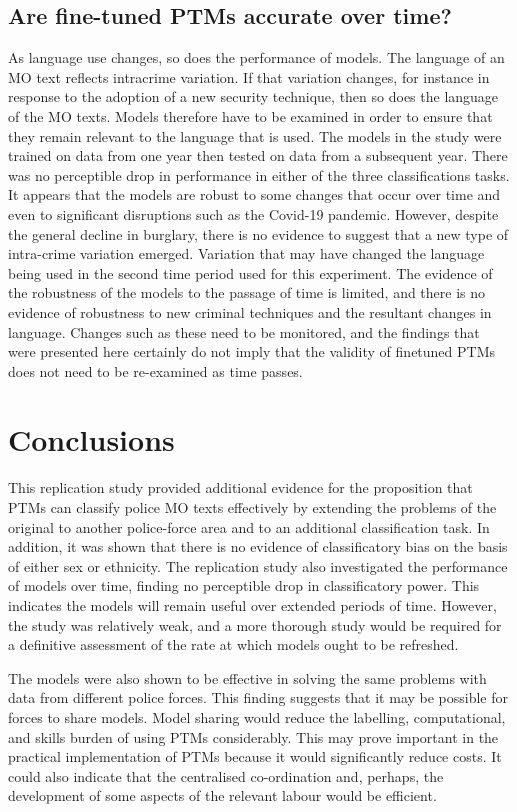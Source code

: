 \subsection{Are fine-tuned PTMs accurate over time?} As language use changes, so does the performance of models. The language of an MO text reflects intracrime variation. If that variation changes, for instance in response to the adoption of a new security technique, then so does the language of the MO texts. Models therefore have to be examined in order to ensure that they remain relevant to the language that is used. The models in the study were trained on data from one year then tested on data from a subsequent year. There was no perceptible drop in performance in either of the three classifications tasks. It appears that the models are robust to some changes that occur over time and even to significant disruptions such as the Covid-19 pandemic. However, despite the general decline in burglary, there is no evidence to suggest that a new type of intra-crime variation emerged. Variation that may have changed the language being used in the second time period used for this experiment. The evidence of the robustness of the models to the passage of time is limited, and there is no evidence of robustness to new criminal techniques and the resultant changes in language. Changes such as these need to be monitored, and the findings that were presented here certainly do not imply that the validity of finetuned PTMs does not need to be re-examined as time passes. 

\section{Conclusions}This replication study provided additional evidence for the proposition that PTMs can classify police MO texts effectively by extending the problems of the original to another police-force area and to an additional classification task. In addition, it was shown that there is no evidence of classificatory bias on the basis of either sex or ethnicity. The replication study also investigated the performance of models over time, finding no perceptible drop in classificatory power. This indicates the models will remain useful over extended periods of time. However, the study was relatively weak, and a more thorough study would be required for a definitive assessment of the rate at which models ought to be refreshed.

The models were also shown to be effective in solving the same problems with data from different police forces. This finding suggests that it may be possible for forces to share models. Model sharing would reduce the labelling, computational, and skills burden of using PTMs considerably. This may prove important in the practical implementation of PTMs because it would significantly reduce costs. It could also indicate that the centralised co-ordination and, perhaps, the development of some aspects of the relevant labour would be efficient.

